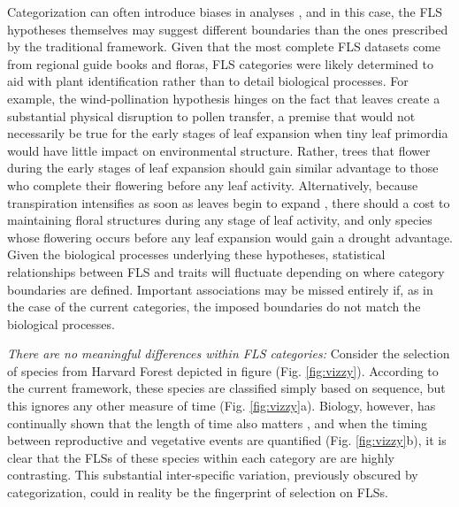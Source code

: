\documentclass{article}
\begin{document}
\noindent Categorization can often introduce biases in analyses \citep{Naggara2011,Royston2006}, and in this case, the FLS hypotheses themselves may suggest different boundaries than the ones prescribed by the traditional framework. Given that the most complete FLS datasets come from regional guide books and floras, FLS categories were likely determined to aid with plant identification rather than to detail biological processes. For example, the wind-pollination hypothesis hinges on the fact that leaves create a substantial physical disruption to pollen transfer, a premise that would not necessarily be true for the early stages of leaf expansion when tiny leaf primordia would have little impact on environmental structure. Rather, trees that flower during the early stages of leaf expansion should gain similar advantage to those who complete their flowering before any leaf activity. Alternatively, because transpiration intensifies as soon as leaves begin to expand \citep{Breda1996,Wang2018}, there should a cost to maintaining floral structures during any stage of leaf activity, and only species whose flowering occurs before any leaf expansion would gain a drought advantage. Given the biological processes underlying these hypotheses, statistical relationships between FLS and traits will fluctuate depending on where category boundaries are defined. Important associations may be missed entirely if, as in the case of the current categories, the imposed boundaries do not match the biological processes.

\emph{There are no meaningful differences within FLS categories:}
 Consider the selection of species from Harvard Forest depicted in figure (Fig. \ref{fig:vizzy}). According to the current framework, these species are classified simply based on sequence, but this ignores any other measure of time (Fig. \ref{fig:vizzy}a). Biology, however, has continually shown that the length of time also matters \citep{Inouye2019}, and when the timing between reproductive and vegetative events are quantified (Fig. \ref{fig:vizzy}b), it is clear that the FLSs of these species within each category are are highly contrasting. This substantial inter-specific variation, previously obscured by categorization, could in reality be the fingerprint of selection on FLSs. %
\end{document}

